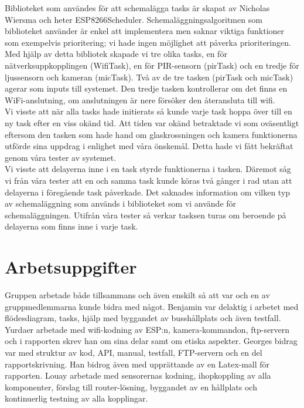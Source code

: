 Biblioteket som användes för att schemalägga tasks är skapat av Nicholas Wiersma och heter ESP8266Scheduler. Schemaläggningsalgoritmen som biblioteket använder är enkel att implementera men saknar viktiga funktioner som exempelvis prioritering; vi hade ingen möjlighet att påverka prioriteringen. Med hjälp av detta bibliotek  skapade vi tre olika tasks, en för nätverksuppkopplingen (WifiTask), en för PIR-sensorn (pirTask) och en tredje för ljussensorn och kameran (micTask). Två av de tre tasken (pirTask och micTask) agerar som inputs till systemet. Den tredje tasken  kontrollerar om det finns en WiFi-anslutning, om anslutningen är nere försöker den återansluta till wifi.\\
Vi visste att när alla tasks hade initierats så kunde varje task hoppa över till en ny task efter en viss okänd tid. Att tiden var okänd betraktade vi som oväsentligt eftersom den tasken som hade hand om glaskrossningen och kamera funktionerna utförde sina uppdrag i enlighet med våra önskemål. Detta hade vi fått bekräftat genom våra tester av systemet.\\

Vi visste att delayerna inne i en task styrde funktionerna i tasken. Däremot såg vi från våra tester att en och samma task kunde köras två gånger i rad utan att delayerna i föregående task påverkade. Det saknades information om vilken typ av schemaläggning som används i biblioteket som vi använde för schemaläggningen. Utifrån våra tester så verkar tasksen turas om beroende på delayerna som finns inne i varje task.



\section{Arbetsuppgifter}
Gruppen arbetade både tillsammans och även enskilt så att var och en av gruppmedlemmarna kunde bidra med något. Benjamin var delaktig i arbetet med flödesdiagram, tasks, hjälp med byggandet av busshållplats och även testfall. Yurdaer arbetade med wifi-kodning av ESP:n, kamera-kommandon, ftp-servern och i rapporten skrev han om sina delar samt om etiska aspekter. Georges bidrag var med struktur av kod, API, manual, testfall, FTP-servern och en del rapportskrivning. Han bidrog även med upprättande av en Latex-mall för rapporten. Louay arbetade med sensorernas kodning, ihopkoppling av alla komponenter, förslag till router-lösning, byggandet av en hållplats och kontinuerlig testning av alla kopplingar. 



 



